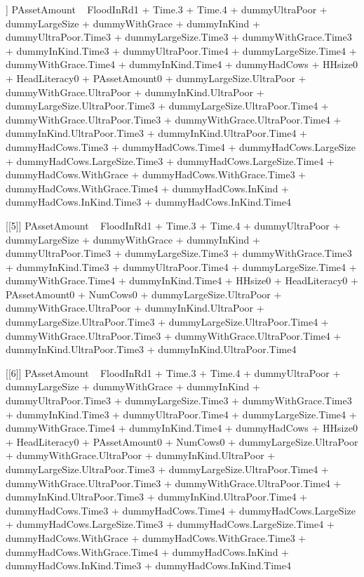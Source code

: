 \begin{Schunk}
\begin{Soutput}
[[4]]
PAssetAmount ~ FloodInRd1 + Time.3 + Time.4 + dummyUltraPoor + 
    dummyLargeSize + dummyWithGrace + dummyInKind + dummyUltraPoor.Time3 + 
    dummyLargeSize.Time3 + dummyWithGrace.Time3 + dummyInKind.Time3 + 
    dummyUltraPoor.Time4 + dummyLargeSize.Time4 + dummyWithGrace.Time4 + 
    dummyInKind.Time4 + dummyHadCows + HHsize0 + HeadLiteracy0 + 
    PAssetAmount0 + dummyLargeSize.UltraPoor + dummyWithGrace.UltraPoor + 
    dummyInKind.UltraPoor + dummyLargeSize.UltraPoor.Time3 + 
    dummyLargeSize.UltraPoor.Time4 + dummyWithGrace.UltraPoor.Time3 + 
    dummyWithGrace.UltraPoor.Time4 + dummyInKind.UltraPoor.Time3 + 
    dummyInKind.UltraPoor.Time4 + dummyHadCows.Time3 + dummyHadCows.Time4 + 
    dummyHadCows.LargeSize + dummyHadCows.LargeSize.Time3 + dummyHadCows.LargeSize.Time4 + 
    dummyHadCows.WithGrace + dummyHadCows.WithGrace.Time3 + dummyHadCows.WithGrace.Time4 + 
    dummyHadCows.InKind + dummyHadCows.InKind.Time3 + dummyHadCows.InKind.Time4

[[5]]
PAssetAmount ~ FloodInRd1 + Time.3 + Time.4 + dummyUltraPoor + 
    dummyLargeSize + dummyWithGrace + dummyInKind + dummyUltraPoor.Time3 + 
    dummyLargeSize.Time3 + dummyWithGrace.Time3 + dummyInKind.Time3 + 
    dummyUltraPoor.Time4 + dummyLargeSize.Time4 + dummyWithGrace.Time4 + 
    dummyInKind.Time4 + HHsize0 + HeadLiteracy0 + PAssetAmount0 + 
    NumCows0 + dummyLargeSize.UltraPoor + dummyWithGrace.UltraPoor + 
    dummyInKind.UltraPoor + dummyLargeSize.UltraPoor.Time3 + 
    dummyLargeSize.UltraPoor.Time4 + dummyWithGrace.UltraPoor.Time3 + 
    dummyWithGrace.UltraPoor.Time4 + dummyInKind.UltraPoor.Time3 + 
    dummyInKind.UltraPoor.Time4

[[6]]
PAssetAmount ~ FloodInRd1 + Time.3 + Time.4 + dummyUltraPoor + 
    dummyLargeSize + dummyWithGrace + dummyInKind + dummyUltraPoor.Time3 + 
    dummyLargeSize.Time3 + dummyWithGrace.Time3 + dummyInKind.Time3 + 
    dummyUltraPoor.Time4 + dummyLargeSize.Time4 + dummyWithGrace.Time4 + 
    dummyInKind.Time4 + dummyHadCows + HHsize0 + HeadLiteracy0 + 
    PAssetAmount0 + NumCows0 + dummyLargeSize.UltraPoor + dummyWithGrace.UltraPoor + 
    dummyInKind.UltraPoor + dummyLargeSize.UltraPoor.Time3 + 
    dummyLargeSize.UltraPoor.Time4 + dummyWithGrace.UltraPoor.Time3 + 
    dummyWithGrace.UltraPoor.Time4 + dummyInKind.UltraPoor.Time3 + 
    dummyInKind.UltraPoor.Time4 + dummyHadCows.Time3 + dummyHadCows.Time4 + 
    dummyHadCows.LargeSize + dummyHadCows.LargeSize.Time3 + dummyHadCows.LargeSize.Time4 + 
    dummyHadCows.WithGrace + dummyHadCows.WithGrace.Time3 + dummyHadCows.WithGrace.Time4 + 
    dummyHadCows.InKind + dummyHadCows.InKind.Time3 + dummyHadCows.InKind.Time4
\end{Soutput}
\end{Schunk}
